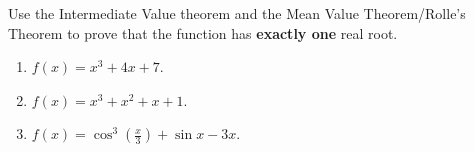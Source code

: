 Use the Intermediate Value theorem and the Mean Value Theorem/Rolle's Theorem to prove that the function has \textbf{exactly one} real root.
\begin{enumerate}
\item \label{problemIVTandMVTx^3+4x+7} $f(x)=x^3+4x+7$.
\item $f(x)= x^3 +x^2+x+1$.
\item \label{problemIVTandMVTcos3xdiv3+sinx-3x} $f(x)=\cos^3 \left({\frac{x}{3}}\right) +\sin x-  3x$.
\end{enumerate}
